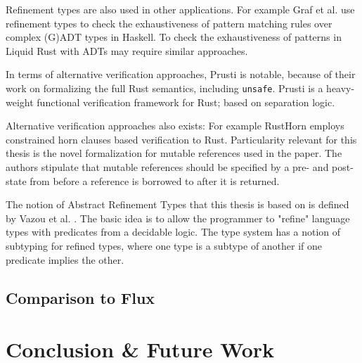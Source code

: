\documentclass{book}
\newcommand{\code}[1]{\texttt{#1}}
\theoremstyle{definition}
\begin{document}
Refinement types are also used in other applications. For example Graf et al. \cite{graf_lower_2020} use refinement types to check the exhaustiveness of pattern matching rules over complex (G)ADT types in Haskell. To check the exhaustiveness of patterns in Liquid Rust with ADTs may require similar approaches.

In terms of alternative verification approaches, Prusti\cite{astrauskas_leveraging_2019} is notable, because of their work on formalizing the full Rust semantics, including \code{unsafe}. Prusti is a heavy-weight functional verification framework for Rust; based on separation logic.

Alternative verification approaches also exists: For example RustHorn\cite{matsushita_rusthorn_2020} employs constrained horn clauses based verification to Rust. Particularity relevant for this thesis is the novel formalization for mutable references used in the paper. The authors stipulate that mutable references should be specified by a pre- and post-state from before a reference is borrowed to after it is returned.

The notion of Abstract Refinement Types that this thesis is based on is defined by Vazou et al. \cite{vazou_abstract_2013}. The basic idea is to allow the programmer to "refine" language types with predicates from a decidable logic. The type system has a notion of subtyping for refined types, where one type is a subtype of another if one predicate implies the other.

\section{Comparison to Flux}

\chapter{Conclusion \& Future Work}

\printbibliography
\end{document}

